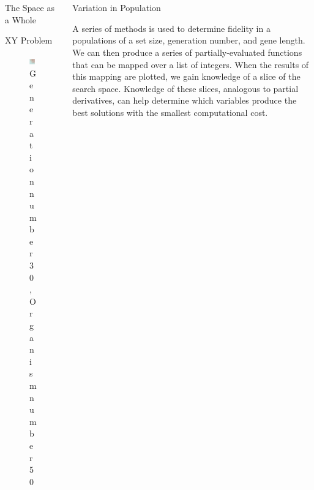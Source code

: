 \documentclass[14pt]{beamer}
\renewcommand{\maketitle}{%
	\begin{center}%
		\Huge\inserttitle\\[5mm]%
		\Large\insertauthor\\[5mm]%
		\Large\insertinstitute%
	\end{center}%
	\vspace*{-1.5ex}%
}
\begin{document}
\begin{frame}{\maketitle}
\begin{columns}
\begin{column}{.45\textwidth}
\begin{block}{The Space as a Whole}
\end{block}
\vspace{1em}
\begin{exampleblock}{XY Problem}
	\begin{figure}[htpb]
		\centering
			\includegraphics[scale=1.1]{xy.png}
		\centering
		\caption{Generation number 30, Organism number 50}
		\label{fig:thing_plot}
	\end{figure}
\end{exampleblock}


\end{column}
							
			\begin{column}{.45\textwidth}
			\begin{block}{Variation in Population}

	A series of methods is used to determine fidelity in a populations of a set size, generation number, and gene length. We can then produce a series of partially-evaluated functions that can be mapped over a list of integers. When the results of this mapping are plotted, we gain knowledge of a slice of the search space. Knowledge of these slices, analogous to partial derivatives, can help determine which variables produce the best solutions with the smallest computational cost. 


\end{block}
\end{column}
\end{columns}
\end{frame}
\end{document}
